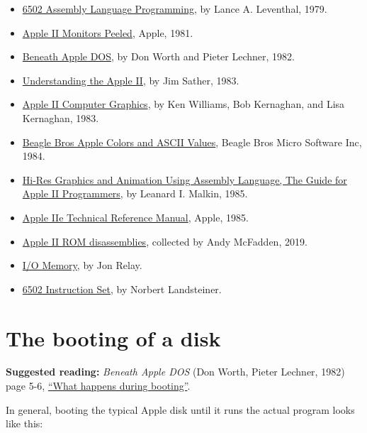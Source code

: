 \documentclass[10pt]{report}
\begin{document}
\begin{itemize}
\item \href{https://archive.org/details/6502alp}{6502 Assembly Language Programming}, by Lance A. Leventhal, 1979.
\item \href{https://archive.org/details/aiimp}{Apple II Monitors Peeled}, Apple, 1981.
\item \href{https://archive.org/details/beneath-apple-dos}{Beneath Apple DOS}, by Don Worth and Pieter Lechner, 1982.
\item \href{https://archive.org/details/understanding_the_apple_ii}{Understanding the Apple II}, by Jim Sather, 1983.
\item \href{https://archive.org/details/williams-et-al-1983-apple-ii-computer-graphics}{Apple II Computer Graphics}, by Ken Williams, Bob Kernaghan, and Lisa Kernaghan, 1983.
\item \href{https://archive.org/details/Beagle_Bros-Poster_1}{Beagle Bros Apple Colors and ASCII Values}, Beagle Bros Micro Software Inc, 1984.
\item \href{https://archive.org/details/hi-res-graphics-and-animation-using-assembly-language}{Hi-Res Graphics and Animation Using Assembly Language, The Guide for Apple II Programmers}, by Leanard I. Malkin, 1985.
\item \href{https://archive.org/details/Apple_IIe_Technical_Reference_Manual/mode/1up}{Apple IIe Technical Reference Manual}, Apple, 1985.
\item \href{https://6502disassembly.com/a2-rom/}{Apple II ROM disassemblies}, collected by Andy McFadden, 2019.
\item \href{https://www.kreativekorp.com/miscpages/a2info/iomemory.shtml}{I/O Memory}, by Jon Relay.
\item \href{https://www.masswerk.at/6502/6502_instruction_set.html}{6502 Instruction Set}, by Norbert Landsteiner.
\end{itemize}

\section{The booting of a disk}

\textbf{Suggested reading:} \textit{Beneath Apple DOS}
(Don Worth, Pieter Lechner, 1982) page 5-6,
\href{https://archive.org/details/beneath-apple-dos/page/n57/mode/2up}{``What happens during booting''}.

In general, booting the typical Apple disk until it runs the actual program
looks like this:
\end{document}
